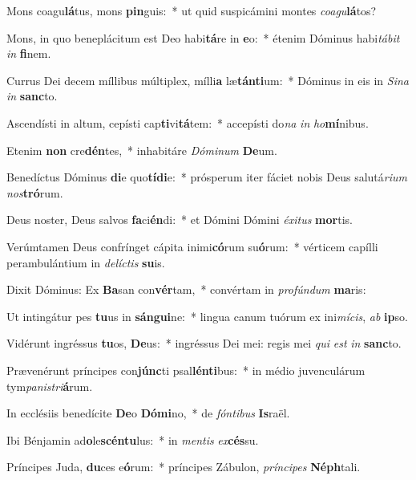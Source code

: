 \item Mons coagu\textbf{lá}tus, mons \textbf{pin}guis:~* ut quid suspicámini montes \textit{co}\textit{a}\textit{gu}\textbf{lá}tos?
\item Mons, in quo beneplácitum est Deo habi\textbf{tá}re in \textbf{e}o:~* étenim Dóminus habi\textit{tá}\textit{bit} \textit{in} \textbf{fi}nem.
\item Currus Dei decem míllibus múltiplex, mílli\textbf{a} læ\textbf{tán}\textbf{ti}um:~* Dóminus in eis in \textit{Si}\textit{na} \textit{in} \textbf{sanc}to.
\item Ascendísti in altum, cepísti cap\textbf{ti}vi\textbf{tá}tem:~* accepísti do\textit{na} \textit{in} \textit{ho}\textbf{mí}nibus.
\item Etenim \textbf{non} cre\textbf{dén}tes,~* inhabitáre \textit{Dó}\textit{mi}\textit{num} \textbf{De}um.
\item Benedíctus Dóminus \textbf{di}e quo\textbf{tí}\textbf{di}e:~* prósperum iter fáciet nobis Deus salutá\textit{ri}\textit{um} \textit{nos}\textbf{tró}rum.
\item Deus noster, Deus salvos \textbf{fa}ci\textbf{én}di:~* et Dómini Dómini \textit{éx}\textit{i}\textit{tus} \textbf{mor}tis.
\item Verúmtamen Deus confrínget cápita inimi\textbf{có}rum su\textbf{ó}rum:~* vérticem capílli perambulántium in \textit{de}\textit{líc}\textit{tis} \textbf{su}is.
\item Dixit Dóminus: Ex \textbf{Ba}san con\textbf{vér}tam,~* convértam in \textit{pro}\textit{fún}\textit{dum} \textbf{ma}ris:
\item Ut intingátur pes \textbf{tu}us in \textbf{sán}\textbf{gui}ne:~* lingua canum tuórum ex ini\textit{mí}\textit{cis}, \textit{ab} \textbf{ip}so.
\item Vidérunt ingréssus \textbf{tu}os, \textbf{De}us:~* ingréssus Dei mei: regis mei \textit{qui} \textit{est} \textit{in} \textbf{sanc}to.
\item Prævenérunt príncipes con\textbf{júnc}ti psal\textbf{lén}\textbf{ti}bus:~* in médio juvenculárum tym\textit{pa}\textit{nis}\textit{tri}\textbf{á}rum.
\item In ecclésiis benedícite \textbf{De}o \textbf{Dó}\textbf{mi}no,~* de \textit{fón}\textit{ti}\textit{bus} \textbf{Is}raël.
\item Ibi Bénjamin ad\textbf{o}le\textbf{scén}\textbf{tu}lus:~* in \textit{men}\textit{tis} \textit{ex}\textbf{cés}su.
\item Príncipes Juda, \textbf{du}ces e\textbf{ó}rum:~* príncipes Zábulon, \textit{prín}\textit{ci}\textit{pes} \textbf{Néph}tali.
